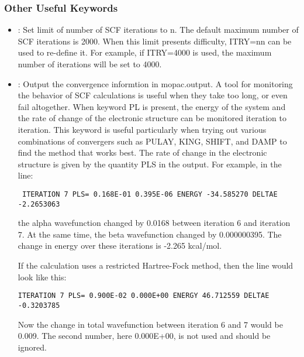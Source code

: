\documentclass[11pt]{JHEP3}
\begin{document}
\subsubsection*{Other Useful Keywords}
\begin{itemize}
\item {}: Set limit of number of SCF iterations to n.
The default maximum number of SCF iterations is 2000. When this 
limit presents difficulty, ITRY=nn can be used to re-define it. For 
example, if ITRY=4000 is used, the maximum number of iterations will 
be set to 4000.

\item {}: Output the convergence informtion in mopac.output.
A tool for monitoring the behavior of SCF 
calculations is useful when they take too long, or even fail 
altogether. When keyword PL is present, the energy of the system and 
the rate of change of the electronic structure can be monitored 
iteration to iteration.  This keyword is useful particularly when 
trying out various combinations of convergers such as PULAY, KING, 
SHIFT, and DAMP to find the method that works best. The rate of 
change in the electronic structure is given by the quantity PLS in 
the output.  For example, in the line:

\begin{lstlisting}
 ITERATION 7 PLS= 0.168E-01 0.395E-06 ENERGY -34.585270 DELTAE   -2.2653063
\end{lstlisting}

the alpha wavefunction changed by 0.0168 between iteration 6 and 
iteration 7. At the same time, the beta wavefunction changed by 
0.000000395. The change in energy over these iterations is -2.265 
kcal/mol.

If the calculation uses a restricted Hartree-Fock method, then the 
line would look like this:

\begin{lstlisting}
ITERATION 7 PLS= 0.900E-02 0.000E+00 ENERGY 46.712559 DELTAE 
-0.3203785 
\end{lstlisting} 

Now the change in total wavefunction between iteration 6 and 7 would 
be 0.009.  The second number, here 0.000E+00, is not used and should 
be ignored.


\end{itemize}
\end{document}
